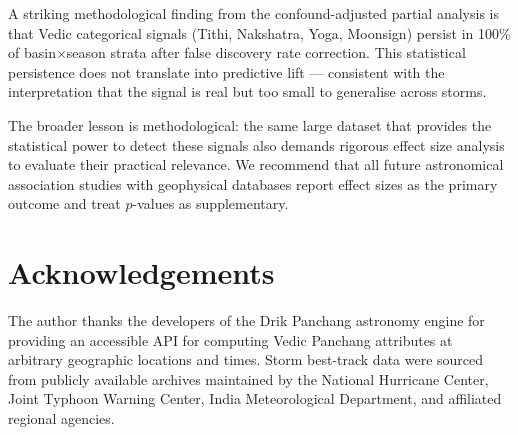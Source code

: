 \documentclass[12pt,a4paper]{article}
\begin{document}
A striking methodological finding from the confound-adjusted partial analysis
is that Vedic categorical signals (Tithi, Nakshatra, Yoga, Moonsign) persist in
100\% of basin$\times$season strata after false discovery rate correction.
This statistical persistence does not translate into predictive lift — consistent
with the interpretation that the signal is real but too small to generalise
across storms.

The broader lesson is methodological: the same large dataset that provides the
statistical power to detect these signals also demands rigorous effect size
analysis to evaluate their practical relevance.
We recommend that all future astronomical association studies with geophysical
databases report effect sizes as the primary outcome and treat $p$-values as
supplementary.

\section*{Acknowledgements}

The author thanks the developers of the Drik Panchang astronomy engine for
providing an accessible API for computing Vedic Panchang attributes at arbitrary
geographic locations and times.
Storm best-track data were sourced from publicly available archives maintained
by the National Hurricane Center, Joint Typhoon Warning Center, India
Meteorological Department, and affiliated regional agencies.
\end{document}
